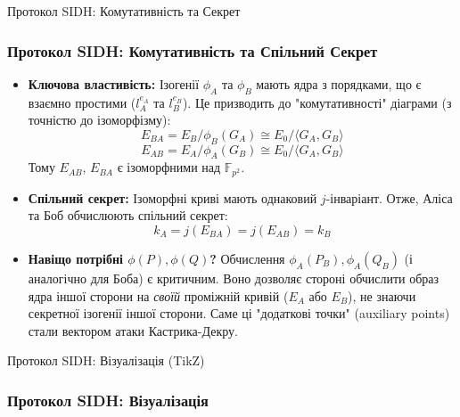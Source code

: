 \documentclass[9pt]{beamer}
\begin{document}
\begin{darkframes}

\begin{frame}{Протокол SIDH: Комутативність та Секрет}
 \frametitle{Протокол SIDH: Комутативність та Спільний Секрет}
 \begin{itemize}
     \item \textbf{Ключова властивість:} Ізогенії $\phi_A$ та $\phi_B$ мають ядра з порядками, що є взаємно простими ($l_A^{e_A}$ та $l_B^{e_B}$). Це призводить до "комутативності" діаграми (з точністю до ізоморфізму):
     $$ E_{BA} = E_B / \phi_B(G_A) \cong E_0 / \langle G_A, G_B \rangle $$
     $$ E_{AB} = E_A / \phi_A(G_B) \cong E_0 / \langle G_A, G_B \rangle $$
     Тому $E_{AB}$, $E_{BA}$ є ізоморфними над $\mathbb{F}_{p^2}$.
     \item \textbf{Спільний секрет:} Ізоморфні криві мають однаковий $j$-інваріант. Отже, Аліса та Боб обчислюють спільний секрет:
     $$ k_A = j(E_{BA}) = j(E_{AB}) = k_B $$
     \item \textbf{Навіщо потрібні $\phi(P), \phi(Q)$?} Обчислення $\phi_A(P_B), \phi_A(Q_B)$ (і аналогічно для Боба) є критичним. Воно дозволяє стороні обчислити образ ядра іншої сторони на \textit{своїй} проміжній кривій ($E_A$ або $E_B$), не знаючи секретної ізогенії іншої сторони. Саме ці "додаткові точки" (auxiliary points) стали вектором атаки Кастрика-Декру.
 \end{itemize}
\end{frame}


\begin{frame}{Протокол SIDH: Візуалізація (TikZ)}
  \frametitle{Протокол SIDH: Візуалізація}

\end{frame}
\end{darkframes}
\end{document}

